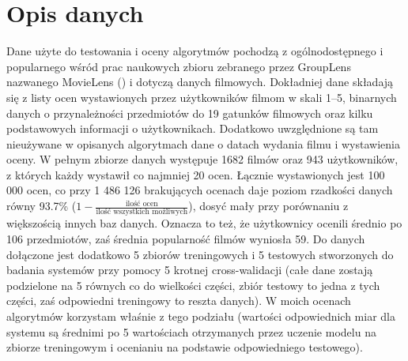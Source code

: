 \documentclass{pracamgr}
\begin{document}
  \section{Opis danych}
   Dane użyte do testowania i oceny algorytmów pochodzą z ogólnodostępnego i popularnego wśród prac naukowych
   zbioru zebranego przez GroupLens nazwanego MovieLens (\cite{ML}) i dotyczą danych filmowych.\newline
   Dokładniej dane składają się z listy ocen wystawionych przez użytkowników filmom w skali 1--5,
   binarnych danych o przynależności przedmiotów do 19 gatunków filmowych oraz kilku podstawowych informacji o użytkownikach.
   Dodatkowo uwzględnione są tam nieużywane w opisanych algorytmach dane o datach wydania filmu i wystawienia oceny.
   W pełnym zbiorze danych występuje 1682 filmów oraz 943 użytkowników, z których każdy wystawił co najmniej 20 ocen.
   Łącznie wystawionych jest 100 000 ocen, co przy 1 486 126 brakujących ocenach daje poziom rzadkości danych równy 93.7\%
   ($1-\frac{\text{ilość ocen}}{\text{ilość wszystkich możliwych}}$), dosyć mały przy porównaniu z większością innych baz danych.
   Oznacza to też, że użytkownicy ocenili średnio po 106 przedmiotów, zaś średnia popularność filmów wyniosła 59.
   Do danych dołączone jest dodatkowo 5 zbiorów treningowych i 5 testowych stworzonych do badania systemów przy pomocy 5 krotnej cross-walidacji
   (całe dane zostają podzielone na 5 równych co do wielkości części, zbiór testowy to jedna z tych części, zaś odpowiedni treningowy to reszta danych).
   W moich ocenach algorytmów korzystam właśnie z tego podziału (wartości odpowiednich miar dla systemu są średnimi po 5 wartościach
   otrzymanych przez uczenie modelu na zbiorze treningowym i ocenianiu na podstawie odpowiedniego testowego).
\end{document}
